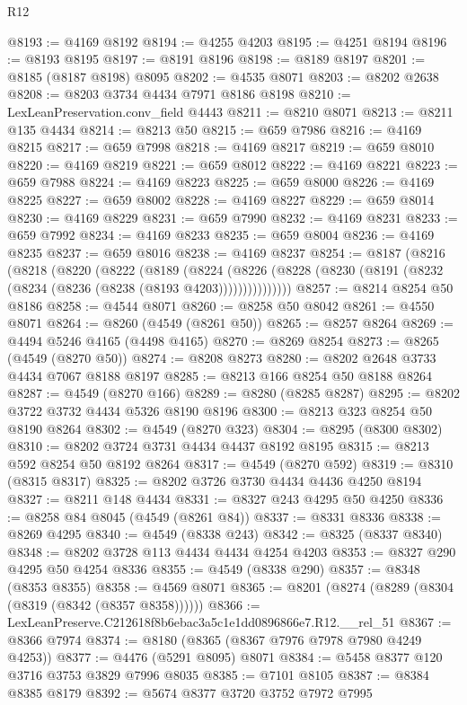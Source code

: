 \begin{lexlean}{R12}
\begin{coremodule}
@8193 := @4169 @8192
@8194 := @4255 @4203
@8195 := @4251 @8194
@8196 := @8193 @8195
@8197 := @8191 @8196
@8198 := @8189 @8197
@8201 := @8185 (@8187 @8198) @8095
@8202 := @4535 @8071
@8203 := @8202 @2638
@8208 := @8203 @3734 @4434 @7971 @8186 @8198
@8210 := LexLeanPreservation.conv_field @4443
@8211 := @8210 @8071
@8213 := @8211 @135 @4434
@8214 := @8213 @50
@8215 := @659 @7986
@8216 := @4169 @8215
@8217 := @659 @7998
@8218 := @4169 @8217
@8219 := @659 @8010
@8220 := @4169 @8219
@8221 := @659 @8012
@8222 := @4169 @8221
@8223 := @659 @7988
@8224 := @4169 @8223
@8225 := @659 @8000
@8226 := @4169 @8225
@8227 := @659 @8002
@8228 := @4169 @8227
@8229 := @659 @8014
@8230 := @4169 @8229
@8231 := @659 @7990
@8232 := @4169 @8231
@8233 := @659 @7992
@8234 := @4169 @8233
@8235 := @659 @8004
@8236 := @4169 @8235
@8237 := @659 @8016
@8238 := @4169 @8237
@8254 := @8187
    (@8216
      (@8218
        (@8220
          (@8222
            (@8189
              (@8224
                (@8226 (@8228 (@8230 (@8191 (@8232 (@8234 (@8236 (@8238 (@8193 @4203)))))))))))))))
@8257 := @8214 @8254 @50 @8186
@8258 := @4544 @8071
@8260 := @8258 @50 @8042
@8261 := @4550 @8071
@8264 := @8260 (@4549 (@8261 @50))
@8265 := @8257 @8264
@8269 := @4494 @5246 @4165 (@4498 @4165)
@8270 := @8269 @8254
@8273 := @8265 (@4549 (@8270 @50))
@8274 := @8208 @8273
@8280 := @8202 @2648 @3733 @4434 @7067 @8188 @8197
@8285 := @8213 @166 @8254 @50 @8188 @8264
@8287 := @4549 (@8270 @166)
@8289 := @8280 (@8285 @8287)
@8295 := @8202 @3722 @3732 @4434 @5326 @8190 @8196
@8300 := @8213 @323 @8254 @50 @8190 @8264
@8302 := @4549 (@8270 @323)
@8304 := @8295 (@8300 @8302)
@8310 := @8202 @3724 @3731 @4434 @4437 @8192 @8195
@8315 := @8213 @592 @8254 @50 @8192 @8264
@8317 := @4549 (@8270 @592)
@8319 := @8310 (@8315 @8317)
@8325 := @8202 @3726 @3730 @4434 @4436 @4250 @8194
@8327 := @8211 @148 @4434
@8331 := @8327 @243 @4295 @50 @4250
@8336 := @8258 @84 @8045 (@4549 (@8261 @84))
@8337 := @8331 @8336
@8338 := @8269 @4295
@8340 := @4549 (@8338 @243)
@8342 := @8325 (@8337 @8340)
@8348 := @8202 @3728 @113 @4434 @4434 @4254 @4203
@8353 := @8327 @290 @4295 @50 @4254 @8336
@8355 := @4549 (@8338 @290)
@8357 := @8348 (@8353 @8355)
@8358 := @4569 @8071
@8365 := @8201 (@8274 (@8289 (@8304 (@8319 (@8342 (@8357 @8358))))))
@8366 := LexLeanPreserve.C212618f8b6ebac3a5c1e1dd0896866e7.R12.__rel_51
@8367 := @8366 @7974
@8374 := @8180 (@8365 (@8367 @7976 @7978 @7980 @4249 @4253))
@8377 := @4476 (@5291 @8095) @8071
@8384 := @5458 @8377 @120 @3716 @3753 @3829 @7996 @8035
@8385 := @7101 @8105
@8387 := @8384 @8385 @8179
@8392 := @5674 @8377 @3720 @3752 @7972 @7995

\end{coremodule}
\end{lexlean}

